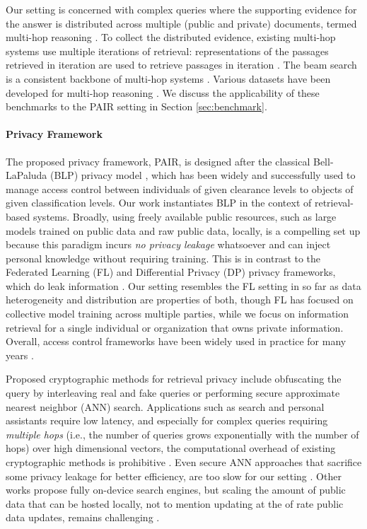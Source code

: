 \documentclass{article}
\renewcommand\cite{\citep}	\newcommand\shortcite{\citeyearpar}\newcommand\newcite{\citet}
\newcommand{\problemshortname}{\textsc{PAIR}\xspace}
\begin{document}
Our setting is concerned with complex queries where the supporting evidence for the answer is distributed across multiple (public and private) documents, termed multi-hop reasoning \cite{welbl2018mhtask}.
To collect the distributed evidence, existing multi-hop systems use multiple iterations of retrieval: representations of the passages retrieved in iteration  are used to retrieve passages in iteration . The beam search is a consistent backbone of multi-hop systems \cite{miller2016kvm, feldman2019multihop, asai2020graphpathsqa, wolfson2020break, xiong2021mdr, qi2021irrrqa, khattab2021baleen}. Various datasets have been developed for multi-hop reasoning \cite{yang2018hotpotqa, talmor2018complexwebqa}. We discuss the applicability of these benchmarks to the \problemshortname setting in Section \ref{sec:benchmark}. 

\paragraph{Privacy Framework} The proposed privacy framework, \problemshortname, is designed after the classical Bell-LaPaluda (BLP) privacy model  \cite{bell2976blm}, which has been widely and successfully used to manage access control between individuals of given clearance levels to objects of given classification levels. Our work instantiates BLP in the context of retrieval-based systems. Broadly, using freely available public resources, such as large models trained on public data and raw public data, locally, is a compelling set up because this paradigm incurs \textit{no privacy leakage} whatsoever and can inject personal knowledge without requiring training. This is in contrast to the Federated Learning (FL) \cite{mcmahan2016fl} and Differential Privacy (DP) \cite{dwork2006dp} privacy frameworks, which do leak information \cite{shokri2017meminference, nasr2019meminference}. Our setting resembles the FL setting in so far as data heterogeneity and distribution are properties of both, though FL has focused on collective model training across multiple parties, while we focus on information retrieval for a single individual or organization that owns private information. 
Overall, access control frameworks have been widely used in practice for many years \cite{hu2006nist}.


Proposed cryptographic methods for retrieval privacy include obfuscating the query by interleaving real and fake queries \cite{gervais2014queryobfusc} or performing
secure approximate nearest neighbor (ANN) search.
Applications such as search and personal assistants require low latency, and especially for complex queries requiring \textit{multiple hops} (i.e., the number of queries grows exponentially with the number of hops) over high dimensional vectors, the computational overhead of existing cryptographic methods is prohibitive \cite{zuber2021privatenn, chen2019privatennsanns}. Even secure ANN approaches that sacrifice some privacy leakage for better efficiency, are too slow for our setting \cite{schreiber2021PrivateNN}.
Other works propose fully on-device search engines, but scaling the amount of public data that can be hosted locally, not to mention updating at the of rate public data updates, remains challenging \cite{cao2019deqa}.
\end{document}
